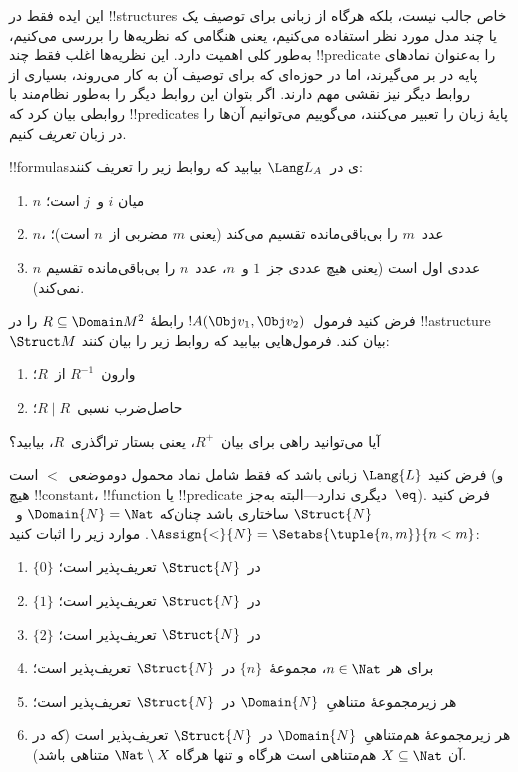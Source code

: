 \documentclass[../../../include/open-logic-section]{subfiles}
\begin{document}
\begin{explain}
این ایده فقط در !!{structure}s خاص جالب نیست، بلکه هرگاه از زبانی برای
توصیف یک یا چند مدل مورد نظر استفاده می‌کنیم، یعنی هنگامی که نظریه‌ها
را بررسی می‌کنیم، به‌طور کلی اهمیت دارد. این نظریه‌ها اغلب فقط چند
!!{predicate} را به‌عنوان نمادهای پایه در بر می‌گیرند، اما در حوزه‌ای
که برای توصیف آن به کار می‌روند، بسیاری از روابط دیگر نیز نقشی مهم
دارند. اگر بتوان این روابط دیگر را به‌طور نظام‌مند با روابطی بیان کرد
که !!{predicate}s پایهٔ زبان را تعبیر می‌کنند، می‌گوییم می‌توانیم آن‌ها
را در زبان \emph{تعریف} کنیم.
\end{explain}

\begin{prob}
!!{formula}sی در~$\Lang L_A$ بیابید که روابط زیر را تعریف کنند:
\begin{enumerate}
\item $n$ میان $i$ و~$j$ است؛
\item $n$، عدد~$m$ را بی‌باقی‌مانده تقسیم می‌کند (یعنی $m$ مضربی از~$n$ است)؛
\item $n$ عددی اول است (یعنی هیچ عددی جز~$1$ و~$n$، عدد~$n$ را
  بی‌باقی‌مانده تقسیم نمی‌کند).
\end{enumerate}
\end{prob}

\begin{prob}
فرض کنید فرمول~$!A(\Obj v_1, \Obj v_2)$ رابطهٔ
$R \subseteq \Domain M^2$ را در !!a{structure}~$\Struct M$ بیان کند.
فرمول‌هایی بیابید که روابط زیر را بیان کنند:
\begin{enumerate}
\item وارون~$R^{-1}$ از~$R$؛
\item حاصل‌ضرب نسبی~$R \mid R$؛
\end{enumerate}
آیا می‌توانید راهی برای بیان~$R^+$، یعنی بستار تراگذری~$R$، بیابید؟
\end{prob}

\begin{prob}
فرض کنید $\Lang{L}$ زبانی باشد که فقط شامل نماد محمول
دوموضعی~$<$ است (و هیچ !!{constant}، !!{function} یا !!{predicate} دیگری
ندارد---البته به‌جز~$\eq$). فرض کنید $\Struct{N}$ ساختاری باشد چنان‌که
$\Domain{N} = \Nat$ و~$\Assign{<}{N} = \Setabs{\tuple{n,m}}{n <
  m}$. موارد زیر را اثبات کنید:
\begin{enumerate}
\item $\{ 0 \}$ در~$\Struct{N}$ تعریف‌پذیر است؛
\item $\{ 1 \}$ در~$\Struct{N}$ تعریف‌پذیر است؛
\item $\{ 2 \}$ در~$\Struct{N}$ تعریف‌پذیر است؛
\item برای هر $n \in \Nat$، مجموعهٔ~$\{ n \}$ در~$\Struct{N}$
  تعریف‌پذیر است؛
\item هر زیرمجموعهٔ متناهیِ~$\Domain{N}$ در~$\Struct{N}$ تعریف‌پذیر است؛
\item هر زیرمجموعهٔ هم‌متناهیِ~$\Domain{N}$ در~$\Struct{N}$ تعریف‌پذیر
  است (که در آن $X \subseteq \Nat$ هم‌متناهی است هرگاه و تنها هرگاه
  $\Nat \setminus X$ متناهی باشد).
\end{enumerate}
\end{prob}
\end{document}
